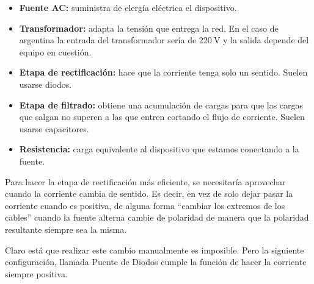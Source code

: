 \begin{itemize}
    \item \textbf{Fuente AC:} suministra de elergía eléctrica el dispositivo.
    \item \textbf{Transformador:} adapta la tensión que entrega la red.
    En el caso de argentina la entrada del transformador sería de $\SI{220}{\volt}$ y la salida depende del equipo en cuestión.
    \item \textbf{Etapa de rectificación:} hace que la corriente tenga solo un sentido.
    Suelen usarse diodos.
    \item \textbf{Etapa de filtrado:} obtiene una acumulación de cargas para que las cargas que salgan no superen a las que entren cortando el flujo de corriente.
    Suelen usarse capacitores.
    \item \textbf{Resistencia:} carga equivalente al dispositivo que estamos conectando a la fuente.
\end{itemize}

\begin{center}
    \def\svgwidth{\linewidth}
    
\end{center}


Para hacer la etapa de rectificación más eficiente, se necesitaría aprovechar cuando la corriente cambia de sentido.
Es decir, en vez de solo dejar pasar la corriente cuando es positiva, de alguna forma ``cambiar los extremos de los cables'' cuando la fuente alterna cambie de polaridad de manera que la polaridad resultante siempre sea la misma.

\begin{center}
    \def\svgwidth{0.6\linewidth}
    
\end{center}

\begin{center}
    \def\svgwidth{0.6\linewidth}
    
\end{center}

Claro está que realizar este cambio manualmente es imposible.
Pero la siguiente configuración, llamada Puente de Diodos cumple la función de hacer la corriente siempre positiva.

\begin{center}
    \def\svgwidth{0.6\linewidth}
    
\end{center}